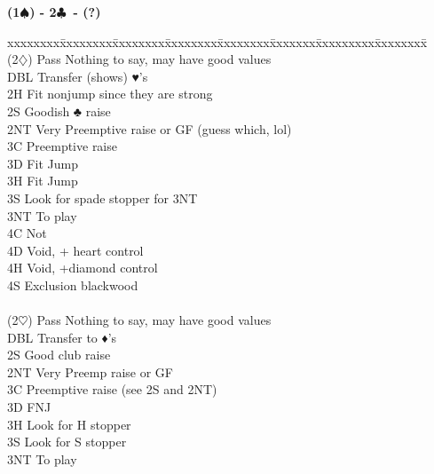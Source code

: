 \documentclass[10pt]{article}
\renewcommand{\c}{$\clubsuit$}
\renewcommand{\d}{$\diamondsuit$}
\newcommand{\h}{$\heartsuit$}
\newcommand{\s}{$\spadesuit$}
\newenvironment{bidtable}[1][]
{\textbf{#1}
  \begin{adjustwidth}{1em}{}
    \addvspace{2pt}
    \begin{tabbing}
      xxxxxxxx\=xxxxxxxx\=xxxxxxxx\=xxxxxxxx\=xxxxxxxx\=xxxxxxx\=xxxxxxxxx\=xxxxxxxx\=\kill}
{\end{tabbing}\end{adjustwidth}\bigskip}%
\begin{document}
\begin{bidtable}[(1\s) - 2\c\ - (?)]
                                                                 \\
(2\d)  \> Pass \> Nothing to say, may have good values           \\
       \> DBL  \> Transfer (shows)  ♥’s                          \\
       \> 2H   \> Fit nonjump since they are strong              \\
       \> 2S   \> Goodish ♣ raise                                \\
       \> 2NT  \> Very Preemptive raise or GF (guess which, lol) \\
       \> 3C   \> Preemptive raise                               \\
       \> 3D   \> Fit Jump                                       \\
       \> 3H   \> Fit Jump                                       \\
       \> 3S   \> Look for spade stopper for 3NT                 \\
       \> 3NT  \> To play                                        \\
       \> 4C   \> Not                                            \\
       \> 4D   \> Void,  + heart control                         \\
       \> 4H   \> Void, +diamond control                         \\
       \> 4S   \> Exclusion blackwood                            \\
                                                                 \\
(2\h)  \> Pass \> Nothing to say, may have good values           \\
       \> DBL  \> Transfer to ♦’s                                \\
       \> 2S   \> Good club raise                                \\
       \> 2NT  \> Very Preemp raise or GF                        \\
       \> 3C   \> Preemptive raise (see 2S and 2NT)              \\
       \> 3D   \> FNJ                                            \\
       \> 3H   \> Look for H stopper                             \\
       \> 3S   \> Look for S stopper                             \\
       \> 3NT  \> To play                                        \\

\end{bidtable}
\end{document}
